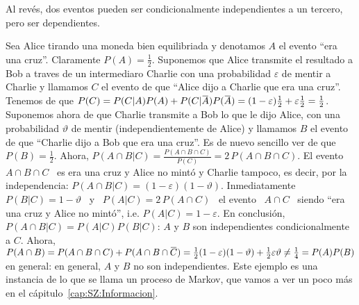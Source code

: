 {Al rev\'es, dos eventos pueden ser condicionalmente independientes a un tercero,
pero  ser  dependientes.
%
\begin{ejemplo}
  Sea Alice tirando una moneda bien equilibriada y denotamos $A$ el evento ``era
  una cruz''.   Claramente $P(A) =  \frac12$.  Suponemos que Alice  transmite el
  resultado  a Bob  a traves  de un  intermediaro Charlie  con  una probabilidad
  $\varepsilon$ de mentir a Charlie y llamamos $C$ el evento de que ``Alice dijo
  a  Charlie  que  era una  cruz''.   Tenemos  de  que  $P(C)  = P(C|A)  P(A)  +
  P(C|\widebar{A})  P(\widebar{A})  =   (1-\varepsilon)  \frac12  +  \varepsilon
  \frac12 = \frac12$.  Suponemos ahora de  que Charlie transmite a Bob lo que le
  dijo Alice, con una  probabilidad $\vartheta$ de mentir (independientemente de
  Alice)  y llamamos  $B$ el  evento de  que ``Charlie  dijo a  Bob que  era una
  cruz''. Es de nuevo sencillo ver de  que $P(B) = \frac12$.  Ahora, $P(A \cap B
  |C) = \frac{P(A \cap B \cap C)}{P(C)} =  2 \, P(A \cap B \cap C)$. El evento \
  $A \cap B \cap  C$ \ es era una cruz y Alice no  mint\'o y Charlie tampoco, es
  decir, por la independencia:  $P(A \cap B |C) = (1-\varepsilon)(1-\vartheta)$.
  Inmediatamente $P(B|C) = 1-\vartheta$  \ y \ $P(A|C) = 2 \,  P(A \cap C)$ \ el
  evento \ $A \cap C$ \ siendo ``era una cruz y Alice no mint\'o'', i.e. $P(A|C)
  = 1-\varepsilon$. En  conclusi\'on, \ $P(A \cap B |C) =  P(A|C) P(B|C)$: $A$ y
  $B$ son independientes condicionalmente a $C$.  Ahora, $P(A \cap B) = P(A \cap
  B    \cap    C)   +    P(A    \cap    B    \cap   \widebar{C})    =    \frac12
  (1-\varepsilon)(1-\vartheta)  + \frac12  \varepsilon \vartheta  \ne  \frac14 =
  P(A)  P(B)$ en  general: en  general, $A$  y $B$  no son  independientes. Este
  ejemplo es una instancia de lo que  se llama un proceso de Markov, que vamos a
  ver un poco m\'as en el c\'apitulo~\ref{cap:SZ:Informacion}.
\end{ejemplo}}
